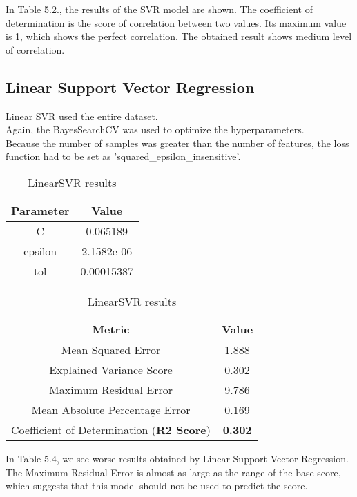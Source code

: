 \documentclass[times, utf8, zavrsni, english]{fer}
\begin{document}
In Table 5.2., the results of the SVR model are shown.
The coefficient of determination is the score of correlation between two values. Its maximum value is 1, which shows the perfect correlation.
The obtained result shows medium level of correlation.

\subsection{Linear Support Vector Regression}
Linear SVR used the entire dataset. \\
Again, the BayesSearchCV was used to optimize the hyperparameters.\\
Because the number of samples was greater than the number of features, the loss function had to be set as 'squared\_epsilon\_insensitive'.
\begin{table}[h!]
	\parbox{.45\linewidth}{
		\centering
		\begin{tabular}{|| c | c ||} 
			\hline
			Parameter & Value \\ [0.5ex] 
			\hline\hline
			C & 0.065189  \\ \hline
			epsilon & 2.1582e-06 \\ \hline
			tol & 0.00015387  \\ 
			\hline
		\end{tabular}
		\caption{Hyperparameteres for LinearSVR}
		\label{table:5}
	}
	\parbox{.45\linewidth}{
		\centering
		\begin{tabular}{|| c | c ||} 
			\hline
			Metric & Value \\ [0.5ex] 
			\hline\hline
			Mean Squared Error & 1.888  \\ \hline
			Explained Variance Score & 0.302\\ \hline
			Maximum Residual Error & 9.786 \\ \hline
			Mean Absolute Percentage Error & 0.169 \\ \hline
			Coefficient of Determination (\textbf{R2 Score}) & \textbf{0.302} \\
			\hline
		\end{tabular}
		\caption{LinearSVR results}
		\label{table:6}
	}
\end{table}

In Table 5.4, we see worse results obtained by Linear Support Vector Regression.
The Maximum Residual Error is almost as large as the range of the base score, which suggests that this model should not be used to predict the score.
\end{document}
